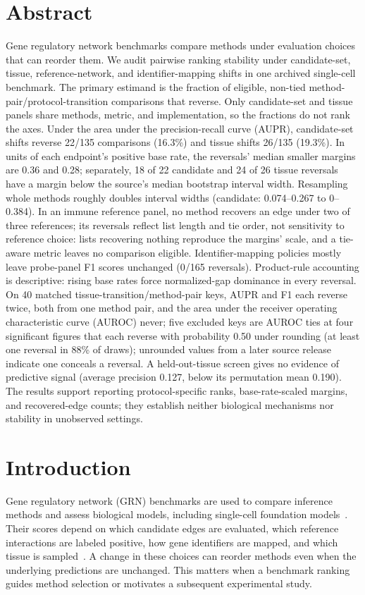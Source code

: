\documentclass[10pt,letterpaper]{article}
\begin{document}
\section*{Abstract}
Gene regulatory network benchmarks compare methods under evaluation choices that can reorder them. We audit pairwise ranking stability under candidate-set, tissue, reference-network, and identifier-mapping shifts in one archived single-cell benchmark. The primary estimand is the fraction of eligible, non-tied method-pair/protocol-transition comparisons that reverse. Only candidate-set and tissue panels share methods, metric, and implementation, so the fractions do not rank the axes. Under the area under the precision-recall curve (AUPR), candidate-set shifts reverse 22/135 comparisons (16.3\%) and tissue shifts 26/135 (19.3\%). In units of each endpoint's positive base rate, the reversals' median smaller margins are 0.36 and 0.28; separately, 18 of 22 candidate and 24 of 26 tissue reversals have a margin below the source's median bootstrap interval width. Resampling whole methods roughly doubles interval widths (candidate: 0.074--0.267 to 0--0.384). In an immune reference panel, no method recovers an edge under two of three references; its reversals reflect list length and tie order, not sensitivity to reference choice: lists recovering nothing reproduce the margins' scale, and a tie-aware metric leaves no comparison eligible. Identifier-mapping policies mostly leave probe-panel F1 scores unchanged (0/165 reversals). Product-rule accounting is descriptive: rising base rates force normalized-gap dominance in every reversal. On 40 matched tissue-transition/method-pair keys, AUPR and F1 each reverse twice, both from one method pair, and the area under the receiver operating characteristic curve (AUROC) never; five excluded keys are AUROC ties at four significant figures that each reverse with probability 0.50 under rounding (at least one reversal in 88\% of draws); unrounded values from a later source release indicate one conceals a reversal. A held-out-tissue screen gives no evidence of predictive signal (average precision 0.127, below its permutation mean 0.190). The results support reporting protocol-specific ranks, base-rate-scaled margins, and recovered-edge counts; they establish neither biological mechanisms nor stability in unobserved settings.

\section*{Introduction}
Gene regulatory network (GRN) benchmarks are used to compare inference methods and assess biological models, including single-cell foundation models~\cite{cui2024scgpt,theodoris2023geneformer}. Their scores depend on which candidate edges are evaluated, which reference interactions are labeled positive, how gene identifiers are mapped, and which tissue is sampled~\cite{pratapa2020beeline,kendiukhov2026evalrelease}. A change in these choices can reorder methods even when the underlying predictions are unchanged. This matters when a benchmark ranking guides method selection or motivates a subsequent experimental study.
\end{document}

